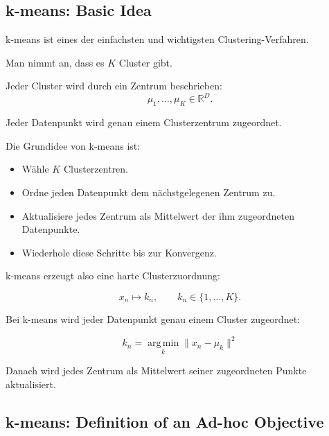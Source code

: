 \documentclass[11pt,a4paper]{scrartcl}
\begin{document}
\subsection{k-means: Basic Idea}

\begin{notebox}
    k-means ist eines der einfachsten und wichtigsten Clustering-Verfahren.

    Man nimmt an, dass es \(K\) Cluster gibt.

    Jeder Cluster wird durch ein Zentrum beschrieben:
    \[
        \mu_1,\dots,\mu_K \in \mathbb{R}^D.
    \]

    Jeder Datenpunkt wird genau einem Clusterzentrum zugeordnet.
\end{notebox}

\begin{solutionbox}
    Die Grundidee von k-means ist:

    \begin{itemize}
        \item Wähle \(K\) Clusterzentren.
        \item Ordne jeden Datenpunkt dem nächstgelegenen Zentrum zu.
        \item Aktualisiere jedes Zentrum als Mittelwert der ihm zugeordneten Datenpunkte.
        \item Wiederhole diese Schritte bis zur Konvergenz.
    \end{itemize}

    k-means erzeugt also eine harte Clusterzuordnung:

    \[
        x_n \longmapsto k_n,
        \qquad
        k_n \in \{1,\dots,K\}.
    \]
\end{solutionbox}

\begin{answerbox}
    Bei k-means wird jeder Datenpunkt genau einem Cluster zugeordnet:

    \[
        \boxed{
            k_n
            =
            \operatorname*{arg\,min}_{k}
            \|x_n-\mu_k\|^2
        }
    \]

    Danach wird jedes Zentrum als Mittelwert seiner zugeordneten Punkte
    aktualisiert.
\end{answerbox}

\subsection{k-means: Definition of an Ad-hoc Objective}
\end{document}
